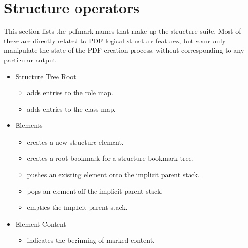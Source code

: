 \documentclass[letterpaper,12pt,english,openany,oneside]{sphinxmanual}
\begin{document}
\section{Structure operators}
\label{\detokenize{pdfmark_Logical:structure-operators}}
This section lists the pdfmark names that make up the structure suite. Most of these are directly related to PDF logical structure features, but some only manipulate the state of the PDF creation process, without corresponding to any particular output.
\begin{itemize}
\item {} 
Structure Tree Root
\begin{itemize}
\item {} 
 adds entries to the role map.

\item {} 
 adds entries to the class map.

\end{itemize}

\item {} 
Elements
\begin{itemize}
\item {} 
 creates a new structure element.

\item {} 
 creates a root bookmark for a structure bookmark tree.

\item {} 
 pushes an existing element onto the implicit parent stack.

\item {} 
 pops an element off the implicit parent stack.

\item {} 
 empties the implicit parent stack.

\end{itemize}

\item {} 
Element Content
\begin{itemize}
\item {} 
 indicates the beginning of marked content.


\end{itemize}
\end{itemize}
\end{document}
